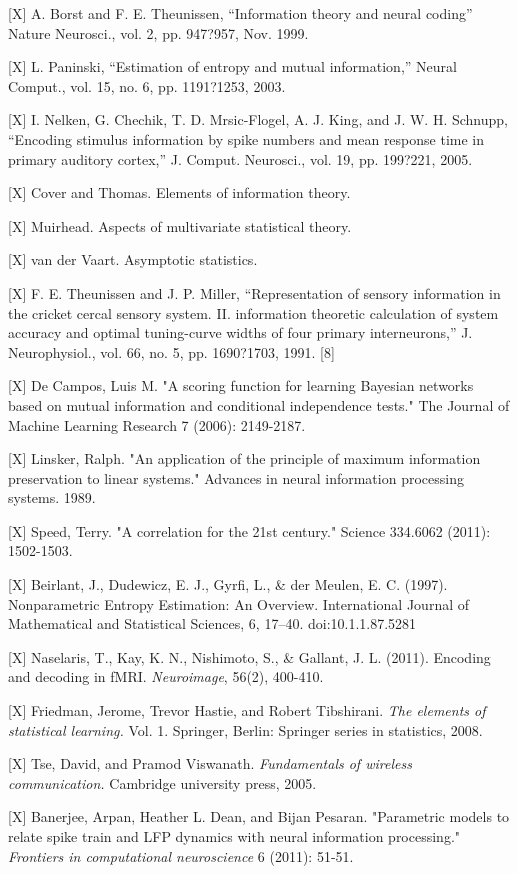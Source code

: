 \documentclass{article}
\begin{document}
[X] A. Borst and F. E. Theunissen, ``Information theory and neural coding''
Nature Neurosci., vol. 2, pp. 947?957, Nov. 1999.

[X] L. Paninski, ``Estimation of entropy and mutual information,'' Neural
Comput., vol. 15, no. 6, pp. 1191?1253, 2003.

[X] I. Nelken, G. Chechik, T. D. Mrsic-Flogel, A. J. King, and J. W. H.
Schnupp, ``Encoding stimulus information by spike numbers and mean
response time in primary auditory cortex,'' J. Comput. Neurosci., vol.
19, pp. 199?221, 2005.

[X] Cover and Thomas.  Elements of information theory.

[X]  Muirhead.  Aspects of multivariate statistical theory.

[X] van der Vaart.  Asymptotic statistics.

[X] F. E. Theunissen and J. P. Miller, ``Representation of sensory
information in the cricket cercal sensory system. II. information
theoretic calculation of system accuracy and optimal tuning-curve
widths of four primary interneurons,'' J. Neurophysiol., vol. 66,
no. 5, pp. 1690?1703, 1991.  [8]

[X] De Campos, Luis M. "A scoring function for learning Bayesian networks
based on mutual information and conditional independence tests." The
Journal of Machine Learning Research 7 (2006): 2149-2187.

[X] Linsker, Ralph. "An application of the principle of maximum
information preservation to linear systems." Advances in neural
information processing systems. 1989.

[X] Speed, Terry. "A correlation for the 21st century." Science
334.6062 (2011): 1502-1503.

[X] Beirlant, J., Dudewicz, E. J., Gyrfi, L., \& der Meulen,
E. C. (1997). Nonparametric Entropy Estimation: An
Overview. International Journal of Mathematical and Statistical
Sciences, 6, 17–40. doi:10.1.1.87.5281

[X] Naselaris, T., Kay, K. N., Nishimoto, S., \& Gallant,
J. L. (2011). Encoding and decoding in fMRI. \emph{Neuroimage}, 56(2),
400-410.

[X] Friedman, Jerome, Trevor Hastie, and Robert Tibshirani. \emph{The elements
of statistical learning.} Vol. 1. Springer, Berlin: Springer series in
statistics, 2008.

[X] Tse, David, and Pramod Viswanath. \emph{Fundamentals of wireless
communication.} Cambridge university press, 2005.

[X] Banerjee, Arpan, Heather L. Dean, and Bijan Pesaran. "Parametric
models to relate spike train and LFP dynamics with neural information
processing." \emph{Frontiers in computational neuroscience} 6 (2011): 51-51.
\end{document}
